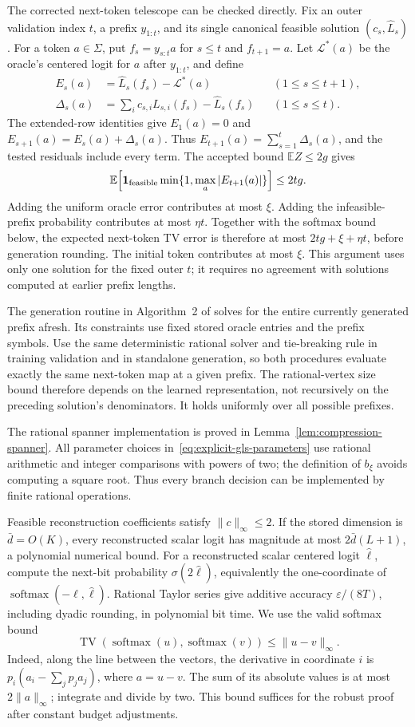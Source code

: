 \documentclass[11pt]{article}
\newcommand{\TV}{\operatorname{TV}}
\theoremstyle{definition}
\theoremstyle{remark}
\begin{document}
The corrected next-token telescope can be checked directly. Fix an outer validation index $t$, a prefix $y_{1:t}$, and its single canonical feasible solution $(c_s,\hat L_s)$. For a token $a\in\Sigma$, put $f_s=y_{s:t}a$ for $s\le t$ and $f_{t+1}=a$. Let $\mathcal L^*(a)$ be the oracle's centered logit for $a$ after $y_{1:t}$, and define
\[
\begin{aligned}
E_s(a)&=\hat L_s(f_s)-\mathcal L^*(a) &&(1\le s\le t+1),\\
\Delta_s(a)&=\sum_i c_{s,i}L_{s,i}(f_s)-\hat L_s(f_s) &&(1\le s\le t).
\end{aligned}
\]
The extended-row identities give $E_1(a)=0$ and $E_{s+1}(a)=E_s(a)+\Delta_s(a)$. Thus $E_{t+1}(a)=\sum_{s=1}^t\Delta_s(a)$, and the tested residuals include every term. The accepted bound $\mathbb E Z\le2g$ gives
\[
\mathbb E\!\left[\mathbf1_{\rm feasible}
 \min\{1,\max_a|E_{t+1}(a)|\}\right]\le2tg.
\]
Adding the uniform oracle error contributes at most $\xi$. Adding the infeasible-prefix probability contributes at most $\eta t$. Together with the softmax bound below, the expected next-token TV error is therefore at most $2tg+\xi+\eta t$, before generation rounding. The initial token contributes at most $\xi$. This argument uses only one solution for the fixed outer $t$; it requires no agreement with solutions computed at earlier prefix lengths.

The generation routine in Algorithm~2 of \citet{gls2} solves for the entire currently generated prefix afresh. Its constraints use fixed stored oracle entries and the prefix symbols. Use the same deterministic rational solver and tie-breaking rule in training validation and in standalone generation, so both procedures evaluate exactly the same next-token map at a given prefix. The rational-vertex size bound therefore depends on the learned representation, not recursively on the preceding solution's denominators. It holds uniformly over all possible prefixes.

The rational spanner implementation is proved in Lemma~\ref{lem:compression-spanner}. All parameter choices in~\eqref{eq:explicit-gls-parameters} use rational arithmetic and integer comparisons with powers of two; the definition of $b_\xi$ avoids computing a square root. Thus every branch decision can be implemented by finite rational operations.

Feasible reconstruction coefficients satisfy $\|c\|_\infty\le2$. If the stored dimension is $\bar d=O(K)$, every reconstructed scalar logit has magnitude at most $2\bar d(L+1)$, a polynomial numerical bound. For a reconstructed scalar centered logit $\hat\ell$, compute the next-bit probability $\sigma(2\hat\ell)$, equivalently the one-coordinate of $\operatorname{softmax}(-\hat\ell,\hat\ell)$. Rational Taylor series give additive accuracy $\varepsilon/(8T)$, including dyadic rounding, in polynomial bit time. We use the valid softmax bound
\[
\TV(\operatorname{softmax}(u),\operatorname{softmax}(v))
\le\|u-v\|_\infty.
\]
Indeed, along the line between the vectors, the derivative in coordinate $i$ is $p_i(a_i-\sum_jp_ja_j)$, where $a=u-v$. The sum of its absolute values is at most $2\|a\|_\infty$; integrate and divide by two. This bound suffices for the robust proof after constant budget adjustments.
\end{document}

